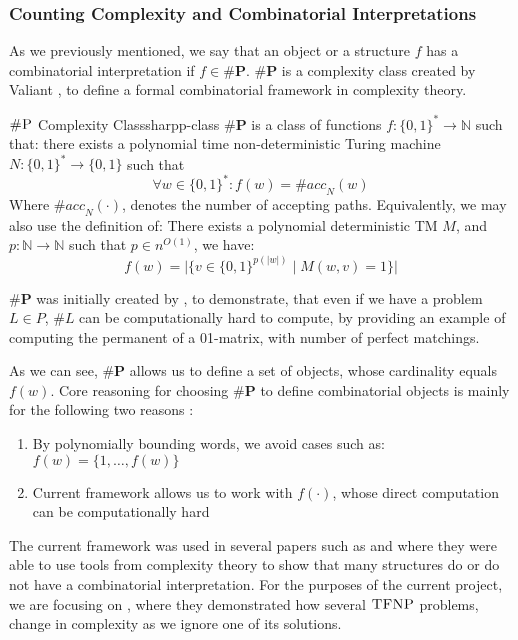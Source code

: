 \subsubsection{Counting Complexity and Combinatorial Interpretations}
As we previously mentioned, we say that an object or a structure $f$
has a combinatorial interpretation if $f \in \textbf{\#P}$. $\textbf{\#P}$
is a complexity class created by Valiant \cite{valiantComplexityComputingPermanent1979},
to define a formal combinatorial framework in complexity theory.


\begin{definitionbox}{$\textsc{\#P}$ Complexity Class}{sharpp-class}
    $\textbf{\#P}$ is a class of functions $f: \{0,1\}^* \to \mathbb{N}$
    such that: there exists a polynomial time non-deterministic
    Turing machine $N: \{0,1\}^* \to \{0,1\}$ such that
    $$
    \forall w \in \{0,1\}^*: f(w) = \textit{\#acc}_N(w)
    $$
    Where $\textit{\#acc}_N(\cdot)$, denotes the number of accepting paths.
    Equivalently, we may also use the definition of: There
    exists a polynomial deterministic TM $M$, and
    $p : \mathbb{N} \to \mathbb{N}$ such that $p \in n^{O(1)}$, we have:
    $$
    f(w) = \Big|\Big\{v \in \{0,1\}^{p(|w|)} \mid M(w, v) =1 \Big\}\Big|
    $$
\end{definitionbox}

$\textbf{\#P}$ was initially created by \cite{valiantComplexityComputingPermanent1979},
to demonstrate, that even if we have a problem $L \in P$, $\#L$ can be computationally
hard to compute, by providing an example of computing the permanent of
a 01-matrix, with number of perfect matchings. 

As we can see, $\textbf{\#P}$ allows us to define a set of objects,
whose cardinality equals $f(w)$. Core reasoning for choosing
$\textbf{\#P}$ to define combinatorial objects is mainly for the 
following two reasons \cite{ikenmeyerPositivitySymmetricGroup2024}: 

\begin{enumerate}
    \item By polynomially bounding words, we avoid cases such as: $f(w) = \{1, \hdots, f(w)\}$
    \item Current framework allows us to work with $f(\cdot)$, whose direct computation can be computationally hard
\end{enumerate}


The current framework was used in several papers such as
\cite{ikenmeyerWhatWhatNot2022} and \cite{ikenmeyerPositivitySymmetricGroup2024}
where they were able to use tools from complexity theory to show that
many structures do or do not have a combinatorial interpretation.
For the purposes of the current project, we are focusing on \cite{ikenmeyerWhatWhatNot2022},
where they demonstrated how several $\textsc{TFNP}$ problems, 
change in complexity as we ignore one of its solutions.


